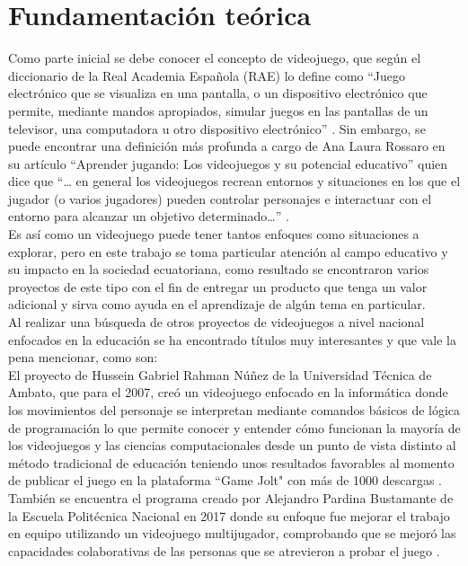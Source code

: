 \documentclass[a4paper, openright, 12pt]{report}
\begin{document}
\section{Fundamentación teórica}
\justify
Como parte inicial se debe conocer el concepto de videojuego, que según el diccionario de la Real Academia Española (RAE) lo define como “Juego electrónico que se visualiza en una pantalla, o un dispositivo electrónico que permite, mediante mandos apropiados, simular juegos en las pantallas de un televisor, una computadora u otro dispositivo electrónico” \cite{Espanola2019}. Sin embargo, se puede encontrar una definición más profunda a cargo de Ana Laura Rossaro en su artículo “Aprender jugando: Los videojuegos y su potencial educativo” quien dice que “… en general los videojuegos recrean entornos y situaciones en los que el jugador (o varios jugadores) pueden controlar personajes e interactuar con el entorno para alcanzar un objetivo determinado…” \cite{Rossaro2012}.\\
Es así como un videojuego puede tener tantos enfoques como situaciones a explorar, pero en este trabajo se toma particular atención al campo educativo y su impacto en la sociedad ecuatoriana, como resultado se encontraron varios proyectos de este tipo con el fin de entregar un producto que tenga un valor adicional y sirva como ayuda en el aprendizaje de algún tema en particular.\\
Al realizar una búsqueda de otros proyectos de videojuegos a nivel nacional enfocados en la educación se ha encontrado títulos muy interesantes y que vale la pena mencionar, como son: \\
El proyecto de Hussein Gabriel Rahman Núñez de la Universidad Técnica de Ambato, que para el 2007, creó un videojuego enfocado en la informática donde los movimientos del personaje se interpretan mediante comandos básicos de lógica de programación lo que permite conocer y entender cómo funcionan la mayoría de los videojuegos y las ciencias computacionales desde un punto de vista distinto al método tradicional de educación teniendo unos resultados favorables al momento de publicar el juego en la plataforma ``Game Jolt" con más de 1000 descargas \cite{RahmanNunez2017}.
También se encuentra el programa creado por Alejandro Pardina Bustamante de la Escuela Politécnica Nacional en 2017 donde su enfoque fue mejorar el trabajo en equipo utilizando un videojuego multijugador, comprobando que se mejoró las capacidades colaborativas de las personas que se atrevieron a probar el juego \cite{PardinaBustamante2016}.\\
\end{document}
